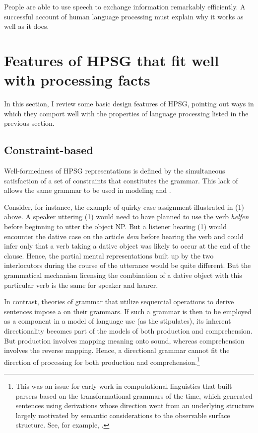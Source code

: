 \documentclass[a4paper]{article}
\begin{document}
People are able to use speech to exchange information remarkably efficiently.  A successful account of human language processing must explain why it works as well as it does.  

\section{Features of HPSG that fit well with processing facts}
\label{sec-features-of-HPSG}

In this section, I review some basic design features of HPSG, pointing out ways in which they comport well with the properties of language processing listed in the previous section.

\subsection{Constraint-based}

Well-formedness of HPSG representations is defined by the simultaneous satisfaction of a set of
constraints that constitutes the grammar.  This lack of  allows the same grammar
to be used in modeling  and .

Consider, for instance, the example of quirky case assignment illustrated in (1) above.  A speaker uttering (1) would need to have planned to use the verb \emph{helfen} before beginning to utter the object NP.  But a listener hearing (1) would encounter the dative case on the article \emph{dem} before hearing the verb and could infer only that a verb taking a dative object was likely to occur at the end of the clause.  Hence, the partial mental representations built up by the two interlocutors during the course of the utterance would be quite different.  But the grammatical mechanism licensing the combination of a dative object with this particular verb is the same for speaker and hearer. 

In contrast, theories of grammar that utilize sequential operations to derive sentences impose a  on their grammars.  If such a grammar is then to be employed as a component in a model of language use (as the  stipulates), its inherent directionality becomes part of the models of both production and comprehension.  But production involves mapping meaning onto sound, whereas comprehension involves the reverse mapping.  Hence, a directional grammar cannot fit the direction of processing for both production and comprehension.\footnote{This was an issue for early work in computational linguistics that built parsers based on the transformational grammars of the time, which generated sentences using derivations whose direction went from an underlying structure largely motivated by semantic considerations to the observable surface structure.  See, for example, \citet{HobbsGrishman75}.}  
\end{document}
